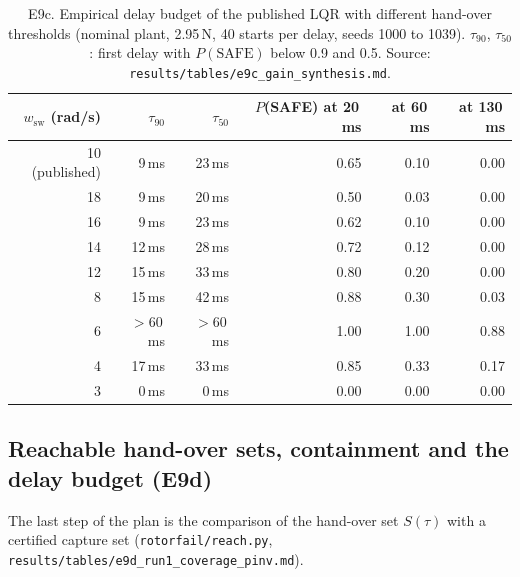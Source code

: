 \begin{table}[h]
\centering\small
\caption{E9c. Empirical delay budget of the published LQR with different hand-over thresholds (nominal plant, 2.95\,N, 40 starts per delay, seeds 1000 to 1039). $\tau_{90}$, $\tau_{50}$: first delay with $P(\text{SAFE})$ below 0.9 and 0.5. Source: \texttt{results/tables/e9c\_gain\_synthesis.md}.}\label{tab:thresholds}
\begin{tabular}{rrrrrr}
\toprule
$w_{\mathrm{sw}}$ (rad/s) & $\tau_{90}$ & $\tau_{50}$ & $P$(SAFE) at 20\,ms & at 60\,ms & at 130\,ms \\
\midrule
10 (published) & 9\,ms & 23\,ms & 0.65 & 0.10 & 0.00 \\
18 & 9\,ms & 20\,ms & 0.50 & 0.03 & 0.00 \\
16 & 9\,ms & 23\,ms & 0.62 & 0.10 & 0.00 \\
14 & 12\,ms & 28\,ms & 0.72 & 0.12 & 0.00 \\
12 & 15\,ms & 33\,ms & 0.80 & 0.20 & 0.00 \\
8 & 15\,ms & 42\,ms & 0.88 & 0.30 & 0.03 \\
6 & $>60$\,ms & $>60$\,ms & 1.00 & 1.00 & 0.88 \\
4 & 17\,ms & 33\,ms & 0.85 & 0.33 & 0.17 \\
3 & 0\,ms & 0\,ms & 0.00 & 0.00 & 0.00 \\
\bottomrule
\end{tabular}
\end{table}

\subsection{Reachable hand-over sets, containment and the delay budget (E9d)}\label{sec:reach}
The last step of the plan is the comparison of the hand-over set $S(\tau)$ with a certified capture set (\texttt{rotorfail/reach.py}, \texttt{results/tables/e9d\_run1\_coverage\_pinv.md}).

